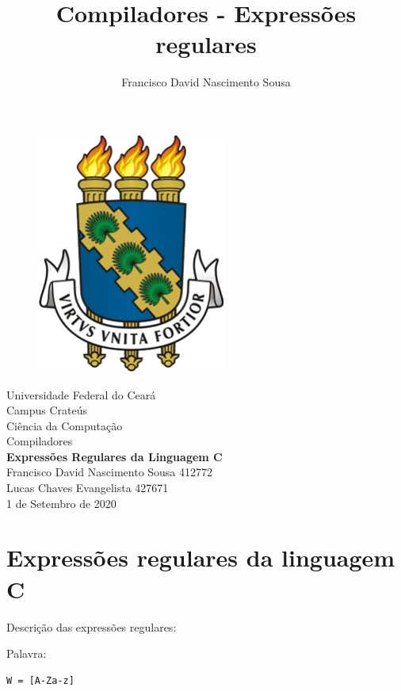 \documentclass[]{article}
\title{Compiladores - Expressões regulares}
\author{Francisco David Nascimento Sousa}
\numberwithin{equation}{section}
\begin{document}
\begin{titlepage}

\begin{center}

	\begin{figure}[h]
		\centering
		\includegraphics[scale=0.5]{ufc_simbol.png}
		\label{Rotulo}
	\end{figure}

	{\LARGE Universidade Federal do Ceará}\\[0.2cm]
	
	{\Large Campus Crateús}\\[0.5cm]
	
	{\large Ciência da Computação}\\[0.2cm]
	
	{\large Compiladores}\\[5.1cm]
	
	{\bf \huge Expressões Regulares da Linguagem C}\\[3.1cm]
	
	{\large Francisco David Nascimento Sousa 412772} \\ [0.2cm]
  {\large Lucas Chaves Evangelista 427671} \\[2.7cm]
	
	{\large 1 de Setembro de 2020}
\end{center}

\end{titlepage}

\section{Expressões regulares da linguagem C}
Descrição das expressões regulares:

Palavra:
\begin{lstlisting}
W = [A-Za-z]
\end{lstlisting}
\end{document}
